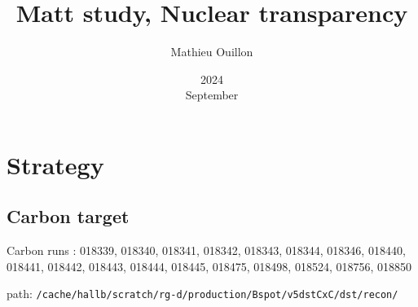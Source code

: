 \documentclass{report}
\title{Matt study, Nuclear transparency}
\date{2024\\ September}
\author{Mathieu Ouillon}
\begin{document}
\maketitle

\section{Strategy}
\subsection{Carbon target}
    Carbon runs : 018339, 018340, 018341, 018342, 018343, 018344, 018346, 018440, 018441, 018442, 018443, 018444, 018445, 018475, 018498, 018524, 018756, 018850
    
    path: \texttt{/cache/hallb/scratch/rg-d/production/Bspot/v5dstCxC/dst/recon/}
\end{document}
